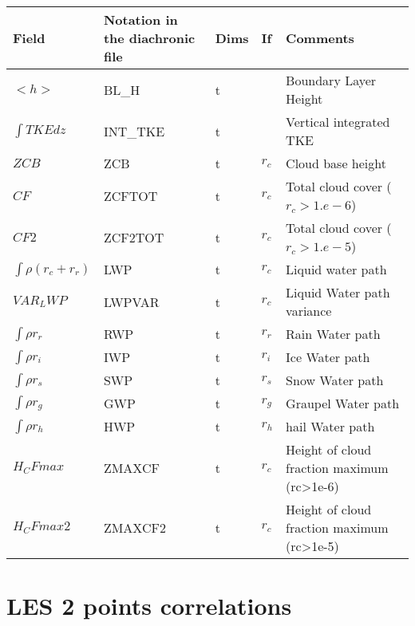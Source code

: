 \begingroup
\renewcommand\arraystretch{1.5}
\begin{longtable}[c]{|p{}|p{}|p{}|p{}|p{}|}
\hline
Field & Notation in the diachronic file & Dims & If  & Comments \\
\hline \hline
\endhead
$<h>$                  & BL\_H       & t   &       & Boundary Layer Height  \\\hline
$\int{TKE}dz$          & INT\_TKE    & t   &       & Vertical integrated TKE  \\\hline
$ZCB$                  & ZCB         & t   & $r_c$ & Cloud base height  \\\hline
$CF$                   & ZCFTOT      & t   & $r_c$ & Total cloud cover ($r_c > 1.e-6$)   \\\hline
$CF2$                  & ZCF2TOT     & t   & $r_c$ & Total cloud cover ($r_c > 1.e-5$)  \\\hline
$\int{\rho (r_c+r_r)}$ & LWP         & t   & $r_c$ & Liquid water path  \\\hline
$VAR_LWP$              & LWPVAR      & t   & $r_c$ & Liquid Water path variance  \\\hline
$\int{\rho r_r}$       & RWP         & t   & $r_r$ & Rain Water path  \\\hline
$\int{\rho r_i}$       & IWP         & t   & $r_i$ & Ice Water path  \\\hline
$\int{\rho r_s}$       & SWP         & t   & $r_s$ & Snow Water path  \\\hline
$\int{\rho r_g}$       & GWP         & t   & $r_g$ & Graupel Water path  \\\hline
$\int{\rho r_h}$       & HWP         & t   & $r_h$ & hail Water path  \\\hline
$H_CFmax$              & ZMAXCF      & t   & $r_c$ & Height of cloud fraction maximum  (rc>1e-6) \\\hline
$H_CFmax2$             & ZMAXCF2     & t   & $r_c$ & Height of cloud fraction maximum  (rc>1e-5) \\\hline
\end{longtable}
\endgroup


\section{LES 2 points correlations}

